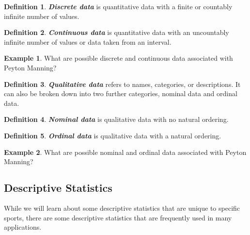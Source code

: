 \documentclass[
  11pt,
]{book}
\theoremstyle{definition}
\newtheorem{definition}{Definition}[chapter]
\theoremstyle{definition}
\newtheorem{example}{Example}[chapter]
\theoremstyle{definition}
\theoremstyle{definition}
\theoremstyle{remark}
\begin{document}
\begin{definition}
\textbf{\emph{Discrete data}} is quantitative data with a finite or countably infinite number of values.
\end{definition}

\begin{definition}
\textbf{\emph{Continuous data}} is quantitative data with an uncountably infinite number of values or data taken from an interval.
\end{definition}

\begin{example}
What are possible discrete and continuous data associated with Peyton Manning?
\end{example}

\hfill\break
\hfill\break
\hfill\break
\hfill\break
\hfill\break

\begin{definition}
\textbf{\emph{Qualitative data}} refers to names, categories, or descriptions. It can also be broken down into
two further categories, nominal data and ordinal data.
\end{definition}

\begin{definition}
\textbf{\emph{Nominal data}} is qualitative data with no natural ordering.
\end{definition}

\begin{definition}
\textbf{\emph{Ordinal data}} is qualitative data with a natural ordering.
\end{definition}

\begin{example}
What are possible nominal and ordinal data associated with Peyton Manning?
\end{example}

\hfill\break
\hfill\break
\hfill\break
\hfill\break
\hfill\break

\vfill

\newpage

\hypertarget{descriptive-statistics-1}{%
\subsection{Descriptive Statistics}\label{descriptive-statistics-1}}

While we will learn about some descriptive statistics that are unique to specific sports, there are some descriptive statistics that are frequently used in many applications.
\end{document}
